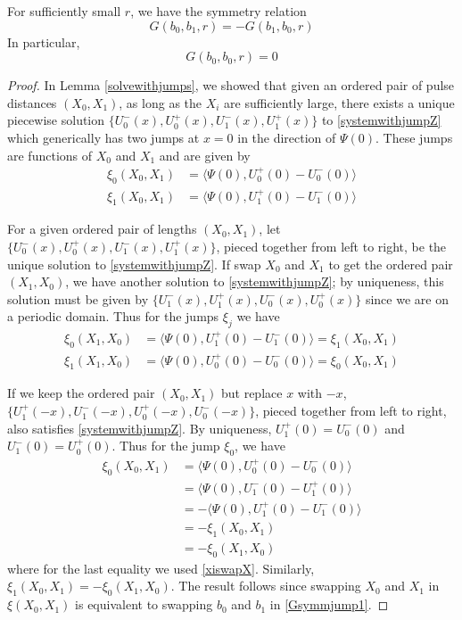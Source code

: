 \documentclass[thesis.tex]{subfiles}
\begin{document}
\begin{lemma}\label{Gsymm}
For sufficiently small $r$, we have the symmetry relation
\begin{equation}\label{Gsymmjump1}
G(b_0, b_1, r) = -G(b_1, b_0, r)
\end{equation}
In particular, 
\[
G(b_0, b_0, r) = 0
\]
\begin{proof}
In Lemma \ref{solvewithjumps}, we showed that given an ordered pair of pulse distances $(X_0, X_1)$, as long as the $X_i$ are sufficiently large, there exists a unique piecewise solution $\{ U_0^-(x), U_0^+(x), U_1^-(x), U_1^+(x) \}$ to \eqref{systemwithjumpZ} which generically has two jumps at $x = 0$ in the direction of $\Psi(0)$. These jumps are functions of $X_0$ and $X_1$ and are given by
\begin{equation}\label{xijumps}
\begin{aligned}
\xi_0(X_0, X_1) &= \langle \Psi(0), U_0^+(0) - U_0^-(0) \rangle  \\
\xi_1(X_0, X_1) &= \langle \Psi(0), U_1^+(0) - U_1^-(0) \rangle 
\end{aligned}
\end{equation}

For a given ordered pair of lengths $(X_0, X_1)$, let $\{ U_0^-(x), U_0^+(x), U_1^-(x), U_1^+(x) \}$, pieced together from left to right, be the unique solution to \eqref{systemwithjumpZ}. If swap $X_0$ and $X_1$ to get the ordered pair $(X_1, X_0)$, we have another solution to \eqref{systemwithjumpZ}; by uniqueness, this solution must be given by $\{ U_1^-(x), U_1^+(x), U_0^-(x), U_0^+(x)\}$ since we are on a periodic domain. Thus for the jumps $\xi_j$ we have
\begin{equation}\label{xiswapX}
\begin{aligned}
\xi_0(X_1, X_0) &= \langle \Psi(0), U_1^+(0) - U_1^-(0) \rangle = \xi_1(X_0, X_1) \\
\xi_1(X_1, X_0) &= \langle \Psi(0), U_0^+(0) - U_0^-(0) \rangle = \xi_0(X_0, X_1)
\end{aligned}
\end{equation}

If we keep the ordered pair $(X_0, X_1)$ but replace $x$ with $-x$, $\{ U_1^+(-x), U_1^-(-x), U_0^+(-x), U_0^-(-x)\}$, pieced together from left to right, also satisfies \eqref{systemwithjumpZ}. By uniqueness, $U_1^+(0) = U_0^-(0)$ and $U_1^-(0) = U_0^+(0)$. Thus for the jump $\xi_0$, we have
\begin{align*}
\xi_0(X_0, X_1) &= \langle \Psi(0), U_0^+(0) - U_0^-(0) \rangle \\
&= \langle \Psi(0), U_1^-(0) - U_1^+(0) \rangle \\
&= -\langle \Psi(0), U_1^+(0) - U_1^-(0) \rangle \\
&= -\xi_1(X_0, X_1) \\
&= -\xi_0(X_1, X_0)
\end{align*}
where for the last equality we used \eqref{xiswapX}. Similarly, $\xi_1(X_0, X_1) = -\xi_0(X_1, X_0)$. The result follows since swapping $X_0$ and $X_1$ in $\xi(X_0, X_1)$ is equivalent to swapping $b_0$ and $b_1$ in \cref{Gsymmjump1}.


\end{proof}
\end{lemma}
\end{document}
